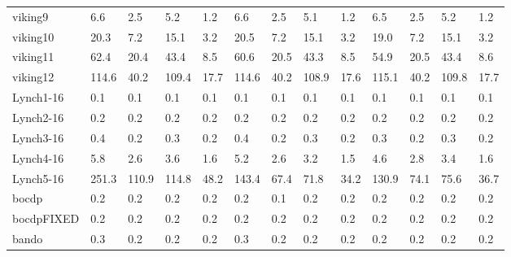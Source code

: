 \begin{table}
\begin{adjustbox}{max totalheight=\textheight}
\begin{tabular}{|l|llllllllllll|}
    viking9            & 6.6      & 2.5      & 5.2      & 1.2      & 6.6   & 2.5  & 5.1   & 1.2  & 6.5               & 2.5               & 5.2               & 1.2               \\
    viking10           & 20.3     & 7.2      & 15.1     & 3.2      & 20.5  & 7.2  & 15.1  & 3.2  & 19.0              & 7.2               & 15.1              & 3.2               \\
    viking11           & 62.4     & 20.4     & 43.4     & 8.5      & 60.6  & 20.5 & 43.3  & 8.5  & 54.9              & 20.5              & 43.4              & 8.6               \\
    viking12           & 114.6    & 40.2     & 109.4    & 17.7     & 114.6 & 40.2 & 108.9 & 17.6 & 115.1             & 40.2              & 109.8             & 17.7              \\ \hline
    Lynch1-16          & 0.1      & 0.1      & 0.1      & 0.1      & 0.1   & 0.1  & 0.1   & 0.1  & 0.1               & 0.1               & 0.1               & 0.1               \\
    Lynch2-16          & 0.2      & 0.2      & 0.2      & 0.2      & 0.2   & 0.2  & 0.2   & 0.2  & 0.2               & 0.2               & 0.2               & 0.2               \\
    Lynch3-16          & 0.4      & 0.2      & 0.3      & 0.2      & 0.4   & 0.2  & 0.3   & 0.2  & 0.3               & 0.2               & 0.3               & 0.2               \\
    Lynch4-16          & 5.8      & 2.6      & 3.6      & 1.6      & 5.2   & 2.6  & 3.2   & 1.5  & 4.6               & 2.8               & 3.4               & 1.6               \\
    Lynch5-16          & 251.3    & 110.9    & 114.8    & 48.2     & 143.4 & 67.4 & 71.8  & 34.2 & 130.9             & 74.1              & 75.6              & 36.7              \\ \hline
    bocdp              & 0.2      & 0.2      & 0.2      & 0.2      & 0.2   & 0.1  & 0.2   & 0.2  & 0.2               & 0.2               & 0.2               & 0.2               \\
    bocdpFIXED         & 0.2      & 0.2      & 0.2      & 0.2      & 0.2   & 0.2  & 0.2   & 0.2  & 0.2               & 0.2               & 0.2               & 0.2               \\
    bando              & 0.3      & 0.2      & 0.2      & 0.2      & 0.3   & 0.2  & 0.2   & 0.2  & 0.2               & 0.2               & 0.2               & 0.2               \\

\end{tabular}
\end{adjustbox}
\end{table}
